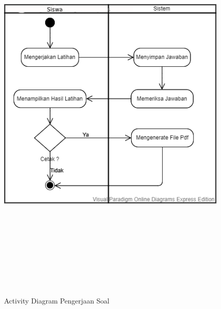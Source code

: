 \documentclass{scrreprt}
\begin{document}
		\begin{figure}
			\includegraphics[width=15cm, height=20cm]{Activity-diagram-latihan.png}
			\caption{Activity Diagram Pengerjaan Soal}
		\end{figure}
	
\end{document}
